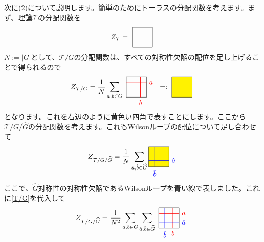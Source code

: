 \documentclass[report,paper=a4, fontsize=12pt, line_length=16cm, number_of_lines=33,dvipdfmx]{jlreq}
\numberwithin{equation}{chapter}
\newcommand{\Gh}{\widehat{G}}
\newcommand{\ah}{\hat{a}}
\newcommand{\bh}{\hat{b}}
\newcommand{\Tcal}{\mathcal{T}}
\begin{document}
次に(2)について説明します。簡単のためにトーラスの分配関数を考えます。まず、理論$\Tcal$の分配関数を
\begin{align}
  Z_{\Tcal}=
    \ 
    \begin{tikzpicture}[baseline=0.4cm]
      \draw (0,0) rectangle (1,1);   
    \end{tikzpicture}
    \ 
\end{align}
$N:=|G|$として、$\Tcal/G$の分配関数は、すべての対称性欠陥の配位を足し上げることで得られるので
\begin{align}
  Z_{\Tcal/G}=\frac{1}{N}
  \sum_{a,b\in G}
    \ 
    \begin{tikzpicture}[baseline=0.4cm]
      \draw (0,0) rectangle (1,1);   
      \draw[thick,red] (0,0.7)--(1,0.7) node[right]{$a$}; 
      \draw[thick,red] (0.7,0) node[below]{$b$}--(0.7,1); 
    \end{tikzpicture}
    \ 
    =:
    \ 
    \begin{tikzpicture}[baseline=0.4cm]
      \filldraw[fill=yellow,draw=black] (0,0) rectangle (1,1);
    \end{tikzpicture}
    \ 
  \label{T/G}
\end{align}
となります。これを右辺のように黄色い四角で表すことにします。ここから$\Tcal/G/\Gh$の分配関数を考えます。これもWilsonループの配位について足し合わせて
\begin{align}
  Z_{\Tcal/G/\Gh}=\frac{1}{N}\sum_{\ah, \bh \in \Gh}\begin{tikzpicture}[baseline=0.4cm]
    \filldraw[fill=yellow,draw=black] (0,0) rectangle (1,1);
    \draw[thick,blue] (0,0.3)--(1,0.3) node[right]{$\ah$}; 
    \draw[thick,blue] (0.3,0) node[below]{$\bh$}--(0.3,1); 
  \end{tikzpicture}
\end{align}
ここで、$\Gh$対称性の対称性欠陥であるWilsonループを青い線で表しました。これに\eqref{T/G}を代入して
\begin{align}
  Z_{\Tcal/G/\Gh}=\frac{1}{N^2}\sum_{a,b\in G}\sum_{\ah, \bh \in \Gh}
  \ 
  \begin{tikzpicture}[baseline=0.4cm]
    \draw (0,0) rectangle (1,1);   
    \draw[thick,red] (0,0.7)--(1,0.7) node[right]{$a$}; 
    \draw[thick,red] (0.7,0) node[below]{$b$}--(0.7,1); 
    \draw[thick,blue] (0,0.3)--(1,0.3) node[right]{$\ah$}; 
    \draw[thick,blue] (0.3,0) node[below]{$\bh$}--(0.3,1); 
  \end{tikzpicture}
  \ 
  \label{T/G/Gh}
\end{align}
\end{document}
